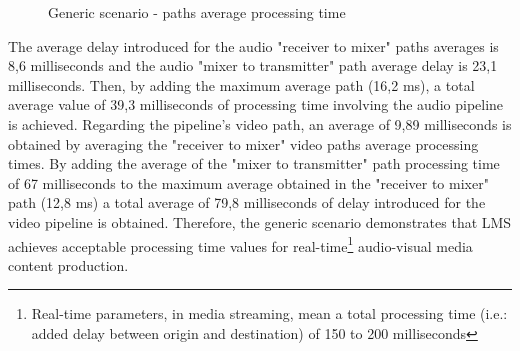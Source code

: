 \begin{figure}[!htb]
  \begin{center}
    \begin{subfigmatrix}{2}
    \end{subfigmatrix}
    \caption{Generic scenario - paths average processing time}
    \label{F:gsavgpt}
  \end{center}
\end{figure}

\vbox{The average delay introduced for the audio "receiver to mixer" paths averages is 8,6 milliseconds and the audio "mixer to transmitter" path average delay is 23,1 milliseconds. Then, by adding the maximum average path (16,2 ms), a total average value of 39,3 milliseconds of processing time involving the audio pipeline is achieved. Regarding the pipeline's video path, an average of 9,89 milliseconds is obtained by averaging the "receiver to mixer" video paths average processing times. By adding the average of the "mixer to transmitter" path processing time of 67 milliseconds to the maximum average obtained in the "receiver to mixer" path (12,8 ms) a total average of 79,8 milliseconds of delay introduced for the video pipeline is obtained. Therefore, the generic scenario demonstrates that LMS achieves acceptable processing time values for real-time\footnote{Real-time parameters, in media streaming, mean a total processing time (i.e.: added delay between origin and destination) of 150 to 200 milliseconds} audio-visual media content production.}

